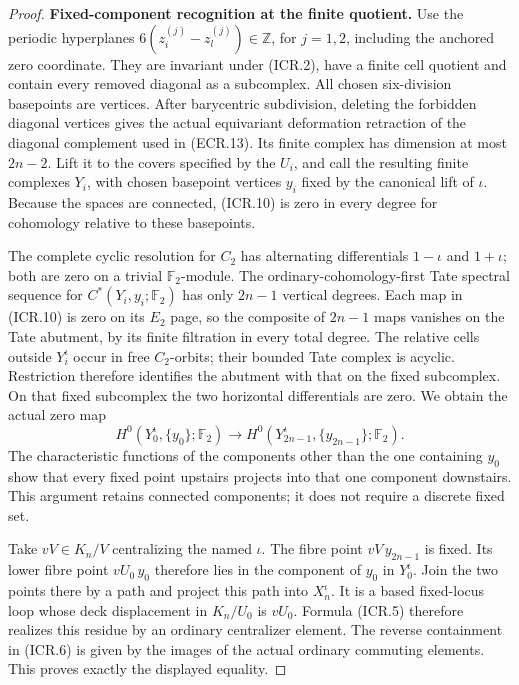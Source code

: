 \begin{proof}
\par\medskip\noindent\textbf{Fixed-component recognition at the finite quotient.}\quad
Use the periodic hyperplanes
$6(z_i^{(j)}-z_l^{(j)})\in\mathbb Z$, for $j=1,2$, including
the anchored zero coordinate.  They are invariant under (ICR.2),
have a finite cell quotient and contain every removed diagonal as
a subcomplex.  All chosen six-division basepoints are vertices.
After barycentric subdivision, deleting the forbidden diagonal
vertices gives the actual equivariant deformation retraction of
the diagonal complement used in (ECR.13).  Its finite complex has
dimension at most $2n-2$.  Lift it to the covers specified by the
$U_i$, and call the resulting finite complexes $Y_i$, with chosen
basepoint vertices $y_i$ fixed by the canonical lift of $\iota$.
Because the spaces are connected, (ICR.10) is zero in every degree
for cohomology relative to these basepoints.

The complete cyclic resolution for $C_2$ has alternating
differentials $1-\iota$ and $1+\iota$; both are zero on a trivial
$\mathbb F_2$-module.  The ordinary-cohomology-first Tate spectral
sequence for $C^*(Y_i,y_i;\mathbb F_2)$ has only $2n-1$ vertical
degrees.  Each map in (ICR.10) is zero on its $E_2$ page, so the
composite of $2n-1$ maps vanishes on the Tate abutment, by its
finite filtration in every total degree.  The relative cells
outside $Y_i^\iota$ occur in free $C_2$-orbits; their bounded Tate
complex is acyclic.  Restriction therefore identifies the abutment
with that on the fixed subcomplex.  On that fixed subcomplex the
two horizontal differentials are zero.  We obtain the actual zero
map
\[
 H^0(Y_0^\iota,\{y_0\};\mathbb F_2)
      \longrightarrow
 H^0(Y_{2n-1}^\iota,\{y_{2n-1}\};\mathbb F_2).
                                                               \tag{ICR.11}
\]
The characteristic functions of the components other than the one
containing $y_0$ show that every fixed point upstairs projects into
that one component downstairs.  This argument retains connected
components; it does not require a discrete fixed set.

Take $vV\in K_n/V$ centralizing the named $\iota$.  The fibre point
$vV\,y_{2n-1}$ is fixed.  Its lower fibre point $vU_0\,y_0$ therefore
lies in the component of $y_0$ in $Y_0^\iota$.  Join the two points
there by a path and project this path into $X_n^\iota$.
It is a based fixed-locus loop whose deck displacement in $K_n/U_0$
is $vU_0$.  Formula (ICR.5) therefore realizes this residue by an
ordinary centralizer element.  The reverse containment in (ICR.6)
is given by the images of the actual ordinary commuting elements.
This proves exactly the displayed equality.


\end{proof}

